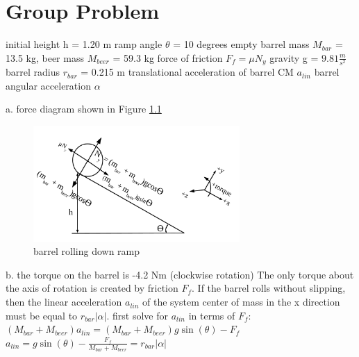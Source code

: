 \chapter{Group Problem}
\label{Group Problem}
initial height h = 1.20 m\newline
ramp angle $\theta$ = 10 degrees\newline
empty barrel mass $M_{bar}$ = 13.5 kg, beer mass $M_{beer}$ = 59.3 kg\newline
force of friction $F_{f} = \mu N_{y}$\newline
gravity g = $9.81 \frac{m}{s^{2}}$\newline
barrel radius $r_{bar}$ = 0.215 m\newline
translational acceleration of barrel CM $a_{lin}$\newline
barrel angular acceleration $\alpha$\newline

a. force diagram shown in Figure \ref{fig:barrelOnRamp}\newline

\begin{figure}[h]
	\centering
	\includegraphics[width=0.7\textwidth]{figures/exam4groupProblemPartA.png}
	\caption{barrel rolling down ramp}
	\label{fig:barrelOnRamp}
\end{figure}

b. the torque on the barrel is -4.2 Nm (clockwise rotation)\newline
The only torque about the axis of rotation is created by friction $F_{f}$.  If the barrel rolls\newline
without slipping, then the linear acceleration $a_{lin}$ of the system center of mass\newline
in the x direction must be equal to $r_{bar} |\alpha|$.\newline
first solve for $a_{lin}$ in terms of $F_{f}$:\newline
$(M_{bar} + M_{beer})a_{lin} = (M_{bar} + M_{beer})g\sin(\theta) - F_{f}$\newline
$a_{lin} = g\sin(\theta) - \frac{F_{f}}{M_{bar} + M_{beer}} = r_{bar} |\alpha|$\newline

